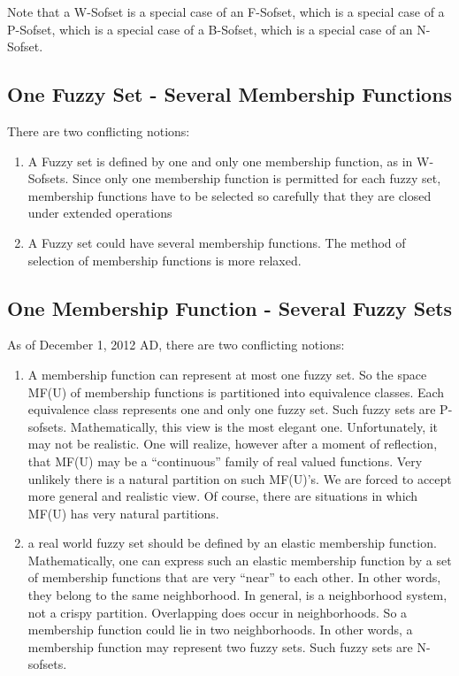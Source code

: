 \documentclass[12pt]{article} %
\begin{document}
Note that a W-Sofset is a special case of an F-Sofset, which is a special case of a P-Sofset, which is a special case of a B-Sofset, which is a special case of an N-Sofset.



\subsection{One Fuzzy Set - Several Membership Functions}
There are two conflicting notions:
\begin{enumerate}
\item{A Fuzzy set is defined by one and only one membership function, as in W-Sofsets. Since only one membership function is permitted for each fuzzy set, membership functions have to be selected so carefully
that they are closed under extended operations}
\item{A Fuzzy set could have several membership functions. The method of selection of membership functions is more relaxed.}
\end{enumerate}

\subsection{One Membership Function - Several Fuzzy Sets}
As of December 1, 2012 AD, there are two conflicting notions:
\begin{enumerate}
\item{A membership function can represent at most
one fuzzy set. So the space MF(U) of membership
functions is partitioned into equivalence classes. Each
equivalence class represents one and only one fuzzy set.
Such fuzzy sets are P-sofsets. Mathematically, this
view is the most elegant one. Unfortunately, it may not
be realistic. One will realize, however after a moment
of reflection, that MF(U) may be a “continuous” family
of real valued functions. Very unlikely there is a natural
partition on such MF(U)’s. We are forced to accept
more general and realistic view. Of course, there are
situations in which MF(U) has very natural partitions.}
\item{a real world fuzzy set should be defined by an elastic
membership function. Mathematically, one can express
such an elastic membership function by a set of
membership functions that are very “near” to each other.
In other words, they belong to the same neighborhood.
In general, is a neighborhood system, not a crispy
partition. Overlapping does occur in neighborhoods. So
a membership function could lie in two neighborhoods.
In other words, a membership function may represent
two fuzzy sets. Such fuzzy sets are N-sofsets.}
\end{enumerate}
\end{document}
